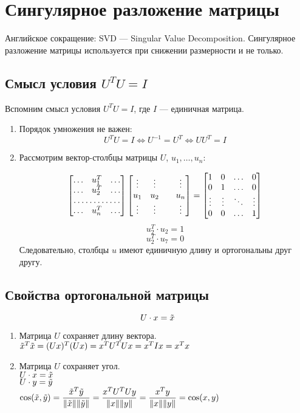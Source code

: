 \documentclass[12pt]{article} %
\theoremstyle{definition} %
\begin{document}
\section{Сингулярное разложение матрицы}
Английское сокращение: SVD — Singular Value Decomposition.
Сингулярное разложение матрицы используется при снижении размерности и не только.
\subsection{Смысл условия $U^T U= I$}
Вспомним смысл условия $U^T U= I$, где $I$ — единичная матрица.\\
\begin{enumerate}
\item  Порядок умножения не важен:
\[U^T U= I \Leftrightarrow U^{-1}=U^T \Leftrightarrow UU^T=I \]
\item  Рассмотрим вектор-столбцы матрицы $U$, $u_1, \ldots, u_n$:

\[ \begin{bmatrix}
\dots & u_1^T & \dots  \\
\dots & u_2^T & \dots  \\
\hdotsfor{3} \\
\dots & u_n^T & \dots
\end{bmatrix}
 \begin{bmatrix}
\vdots & \vdots &   & \vdots \\
u_1 & u_2 &  & u_n \\
\vdots & \vdots & & \vdots
\end{bmatrix} =
\begin{bmatrix}
1 & 0 & \hdots & 0 \\
0 & 1 & \hdots & 0 \\
\vdots & \vdots & \ddots & \vdots \\
0 & 0 & \hdots & 1 \\
\end{bmatrix}
\]
\[
u_2^T \cdot u_2 = 1
\]
\[
u_2^T \cdot u_7 = 0
\]
Следовательно, столбцы $u$ имеют единичную длину и ортогональны друг другу.\\
\end{enumerate}
\subsection{Свойства ортогональной матрицы}
\[ U \cdot x=\Tilde{x} \]
\begin{enumerate}
\item Матрица $U$ сохраняет длину вектора.\\
$\Tilde{x}^T \Tilde{x}= (Ux)^T (Ux)= x^T U^T U x = x^T I x=x^T x$
\item Матрица $U$ сохраняет угол.\\
$U \cdot x=\Tilde{x}$\\
$U \cdot y=\Tilde{y}$\\
$\cos(\Tilde{x},\Tilde{y})= \dfrac{\Tilde{x}^T\Tilde{y}}{\|\Tilde{x}\|\|\Tilde{y}\|}=
\dfrac{x^T U^T Uy}{\|x\|\|y\|}= \dfrac{x^Ty}{\|x\|\|y\|}=\cos(x,y)$\\
\end{enumerate}
\end{document}
